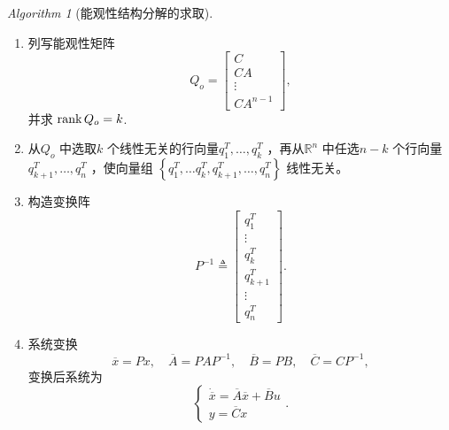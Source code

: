 \documentclass[14pt,a4paper]{article}
\theoremstyle{plain}
\theoremstyle{definition}
\theoremstyle{remark}
\theoremstyle{plain}
\theoremstyle{plain}
\theoremstyle{plain}
\theoremstyle{definition}
\theoremstyle{remark}
\newtheorem{alg}{Algorithm}[section]
\numberwithin{equation}{section}
\begin{document}
				\begin{alg}[能观性结构分解的求取]  
				\label{alg:能观性结构分解的求取}
					\ 
					\begin{enumerate}
						\item 列写能观性矩阵
							\[
							Q_o = \begin{bmatrix}
								C\\ 
								CA\\
								\vdots\\
								CA^{n-1}
							\end{bmatrix} 
							,\] 
							并求 $\mathop{\textnormal{rank}} Q_o = k$. 
						\item 从$Q_o$ 中选取$k$ 个线性无关的行向量$q_1^T,\ldots ,q_{k}^T$ ，再从$\mathbb{R}^{n}$ 中任选$n-k$ 个行向量$q_{k+1}^T,\ldots ,q_{n}^T$ ，使向量组 $\left\{ q_1^T,\ldots q_{k}^T,q_{k+1}^T,\ldots ,q_{n}^T \right\}$ 线性无关。 
						\item 构造变换阵
							\[
							P^{-1} \triangleq \begin{bmatrix}
								q_1^T \\ \vdots \\q_{k}^T \\ q_{k+1}^T  \\ \vdots \\ q_{n}^T
							\end{bmatrix} 
							.\] 
						\item 系统变换
							\[
							\overline{x}=Px,\quad\overline{A}=PA P^{-1},\quad \overline{B}=PB,\quad \overline{C}=CP^{-1}
							,\] 
							变换后系统为
							\[
							\begin{cases}
								\dot{\overline{x}} = \overline{A} \overline{x} + \overline{B} u \\ 
								y = \overline{C} x
							\end{cases} 
							.\] 
					\end{enumerate} 
				\end{alg} 
\end{document}
